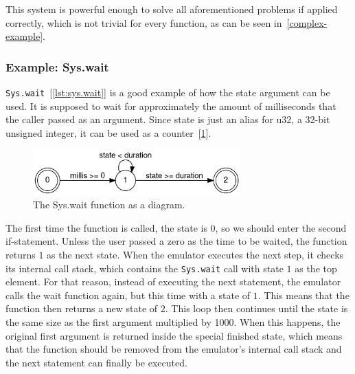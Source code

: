 This system is powerful enough to solve all aforementioned problems if applied correctly, which is not trivial for every function, as can be seen in~\cref{complex-example}.
\subsubsection{Example: Sys.wait} \label{sys.wait-example}
\verb+Sys.wait+~[\ref{lst:sys.wait}] is a good example of how the state argument can be used.
It is supposed to wait for approximately the amount of milliseconds that the caller passed as an argument.
Since state is just an alias for u32, a 32-bit unsigned integer, it can be used as a counter~[\ref{fig:wait-dfa}].
\begin{center}
  \begin{figure}[ht]
    \centering
    \includegraphics[width=8cm]{fig/wait.png}
    \caption{The Sys.wait function as a diagram.}
    \label{fig:wait-dfa}
  \end{figure}
\end{center}
The first time the function is called, the state is \(0\), so we should enter the second if-statement.
Unless the user passed a zero as the time to be waited, the function returns \(1\) as the next state.
When the emulator executes the next step, it checks its internal call stack, which contains the \verb+Sys.wait+ call with state \(1\) as the top element.
For that reason, instead of executing the next statement, the emulator calls the wait function again, but this time with a state of \(1\).
This means that the function then returns a new state of \(2\).
This loop then continues until the state is the same size as the first argument multiplied by 1000.
When this happens, the original first argument is returned inside the special finished state, which means that the function should be removed from the emulator's internal call stack and the next statement can finally be executed.
